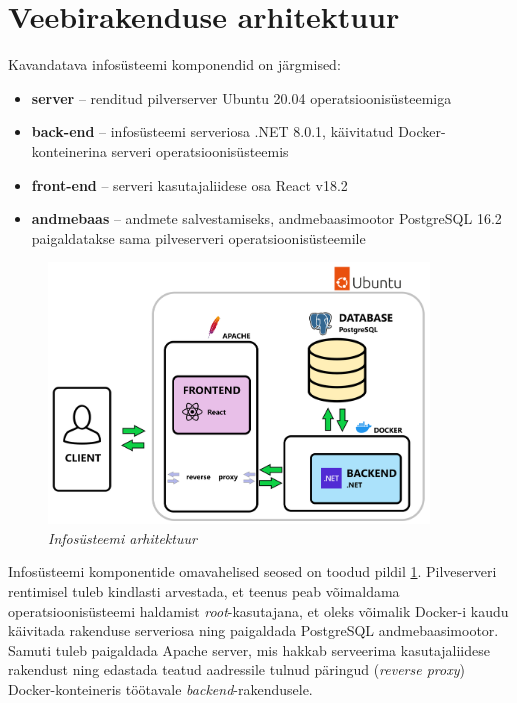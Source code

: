 \section{Veebirakenduse arhitektuur}
Kavandatava infosüsteemi komponendid on järgmised:
\begin{itemize}
    \item \textbf{server} -- renditud pilverserver Ubuntu 20.04 operatsioonisüsteemiga
    \item \textbf{back-end} -- infosüsteemi serveriosa .NET 8.0.1, käivitatud Docker-konteinerina serveri operatsioonisüsteemis
    \item \textbf{front-end} -- serveri kasutajaliidese osa React v18.2
    \item \textbf{andmebaas} -- andmete salvestamiseks, andmebaasimootor PostgreSQL 16.2 paigaldatakse sama pilveserveri operatsioonisüsteemile
\end{itemize}

\begin{figure}[ht]
    \centering
    \includegraphics[width=0.9\textwidth]{figures/analysis/architecture.png}
    \caption[Infosüsteemi arhitektuur]{\textit{Infosüsteemi arhitektuur}}
    \label{fig:architecture}
\end{figure}

Infosüsteemi komponentide omavahelised seosed on toodud pildil \ref{fig:architecture}.
Pilveserveri rentimisel tuleb kindlasti arvestada, et teenus peab võimaldama operatsioonisüsteemi
haldamist \textit{root}-kasutajana, et oleks võimalik Docker-i kaudu käivitada rakenduse serveriosa ning
paigaldada PostgreSQL andmebaasimootor. Samuti tuleb paigaldada Apache server, mis hakkab 
serveerima kasutajaliidese rakendust ning edastada teatud aadressile tulnud päringud (\textit{reverse proxy})
Docker-konteineris töötavale \textit{backend}-rakendusele.